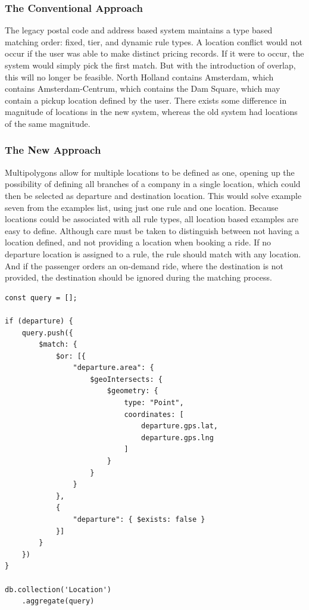 \subsubsection{The Conventional Approach}
The legacy postal code and address based system maintains a type based matching order: fixed, tier, and dynamic rule types. A location conflict would not occur if the user was able to make distinct pricing records. If it were to occur, the system would simply pick the first match. But with the introduction of overlap, this will no longer be feasible. North Holland contains Amsterdam, which contains Amsterdam-Centrum, which contains the Dam Square, which may contain a pickup location defined by the user. There exists some difference in magnitude of locations in the new system, whereas the old system had locations of the same magnitude.

\subsubsection{The New Approach}
Multipolygons allow for multiple locations to be defined as one, opening up the possibility of defining all branches of a company in a single location, which could then be selected as departure and destination location. This would solve example seven from the examples list, using just one rule and one location. Because locations could be associated with all rule types, all location based examples are easy to define. Although care must be taken to distinguish between not having a location defined, and not providing a location when booking a ride. If no departure location is assigned to a rule, the rule should match with any location. And if the passenger orders an on-demand ride, where the destination is not provided, the destination should be ignored during the matching process.

\begin{center}
\noindent\begin{minipage}{.85\textwidth}
\begin{lstlisting}[caption={Matching departure.}, label={lst:matching-departure}]
const query = [];

if (departure) {
	query.push({
		$match: {
			$or: [{
				"departure.area": {
					$geoIntersects: {
						$geometry: {
							type: "Point",
							coordinates: [
								departure.gps.lat,
								departure.gps.lng
							]
						}
					}
				}
			},
			{
				"departure": { $exists: false }
			}]
		}
	})
}

db.collection('Location')
	.aggregate(query)
\end{lstlisting}
\end{minipage}
\end{center}

